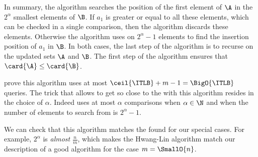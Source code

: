 In summary, the algorithm searches the position of the first element of \(\A\)
in the \(2^{\alpha}\) smallest elements of \(\B\). If \(a_1\) is greater or
equal to all these elements, which can be checked in a single comparison, then
the algorithm discards these elements. Otherwise the algorithm uses
\binarysearch on \(2^{\alpha}-1\) elements to find the insertion position of
\(a_1\) in \(\B\). In both cases, the last step of the algorithm is to recurse
on the updated sets \(\A\) and \(\B\). The first step of the algorithm ensures that
\(\card{\A} \le \card{\B}\).

\citet*{DBLP:journals/siamcomp/HwangL72} prove this algorithm uses at most
\(\ceil{\ITLB} + m - 1 = \BigO{\ITLB}\) queries. The trick that allows to
get so close to the \ITLB with this algorithm resides in the choice of
\(\alpha\). Indeed \binarysearch uses at most \(\alpha\) comparisons
when \(\alpha \in \N\) and when the number of elements to search
from is \(2^{\alpha}-1\).

We can check that this algorithm matches the \ITLB found for our
special cases. For example, \(2^\alpha\) is \emph{almost} \(\frac{n}{m}\),
which makes the Hwang-Lin algorithm match our description of a good algorithm
for the case \(m = \SmallO{n}\).
